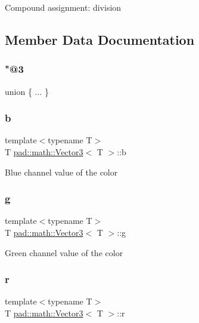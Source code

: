 Compound assignment\+: division 

\subsection{Member Data Documentation}
\mbox{\label{structpad_1_1math_1_1_vector3_a8670dc45bc5340b981d69ebac1fc9a4b}} 
\subsubsection{\texorpdfstring{"@3}{@3}}
{\footnotesize\ttfamily union \{ ... \} }

\mbox{\label{structpad_1_1math_1_1_vector3_afaba266e93b4c9f0a14048934ac2f3f6}} 
\subsubsection{\texorpdfstring{b}{b}}
{\footnotesize\ttfamily template$<$typename T$>$ \\
T \mbox{\hyperlink{structpad_1_1math_1_1_vector3}{pad\+::math\+::\+Vector3}}$<$ T $>$\+::b}

Blue channel value of the color \mbox{\label{structpad_1_1math_1_1_vector3_ab0c584460b01a899fe4504c48c2037e4}} 
\subsubsection{\texorpdfstring{g}{g}}
{\footnotesize\ttfamily template$<$typename T$>$ \\
T \mbox{\hyperlink{structpad_1_1math_1_1_vector3}{pad\+::math\+::\+Vector3}}$<$ T $>$\+::g}

Green channel value of the color \mbox{\label{structpad_1_1math_1_1_vector3_a605d25418ec0079b504fcec127e7bea4}} 
\subsubsection{\texorpdfstring{r}{r}}
{\footnotesize\ttfamily template$<$typename T$>$ \\
T \mbox{\hyperlink{structpad_1_1math_1_1_vector3}{pad\+::math\+::\+Vector3}}$<$ T $>$\+::r}

